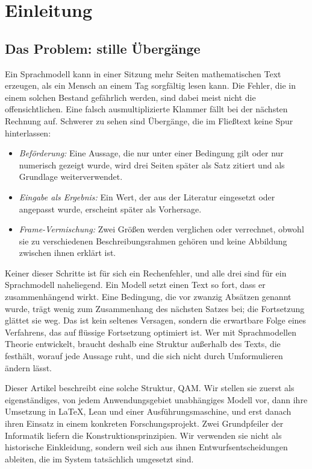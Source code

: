 \section{Einleitung}\label{sec:einleitung}

\subsection{Das Problem: stille Übergänge}

Ein Sprachmodell kann in einer Sitzung mehr Seiten mathematischen Text erzeugen, als ein Mensch an einem Tag sorgfältig lesen
kann. Die Fehler, die in einem solchen Bestand gefährlich werden, sind dabei meist nicht die offensichtlichen. Eine falsch
ausmultiplizierte Klammer fällt bei der nächsten Rechnung auf. Schwerer zu sehen sind Übergänge, die im Fließtext keine Spur
hinterlassen:
\begin{itemize}[nosep]
\item \emph{Beförderung:} Eine Aussage, die nur unter einer Bedingung gilt oder nur numerisch gezeigt wurde, wird drei Seiten
später als Satz zitiert und als Grundlage weiterverwendet.
\item \emph{Eingabe als Ergebnis:} Ein Wert, der aus der Literatur eingesetzt oder angepasst wurde, erscheint später als
Vorhersage.
\item \emph{Frame-Vermischung:} Zwei Größen werden verglichen oder verrechnet, obwohl sie zu verschiedenen Beschreibungsrahmen
gehören und keine Abbildung zwischen ihnen erklärt ist.
\end{itemize}
Keiner dieser Schritte ist für sich ein Rechenfehler, und alle drei sind für ein Sprachmodell naheliegend. Ein Modell setzt
einen Text so fort, dass er zusammenhängend wirkt. Eine Bedingung, die vor zwanzig Absätzen genannt wurde, trägt wenig zum
Zusammenhang des nächsten Satzes bei; die Fortsetzung glättet sie weg. Das ist kein seltenes Versagen, sondern die erwartbare
Folge eines Verfahrens, das auf flüssige Fortsetzung optimiert ist. Wer mit Sprachmodellen Theorie entwickelt, braucht deshalb
eine Struktur außerhalb des Texts, die festhält, worauf jede Aussage ruht, und die sich nicht durch Umformulieren ändern lässt.

Dieser Artikel beschreibt eine solche Struktur, QAM. Wir stellen sie zuerst als eigenständiges, von jedem Anwendungsgebiet
unabhängiges Modell vor, dann ihre Umsetzung in \LaTeX, Lean und einer Ausführungsmaschine, und erst danach ihren Einsatz in einem
konkreten Forschungsprojekt. Zwei Grundpfeiler der Informatik liefern die Konstruktionsprinzipien. Wir verwenden sie nicht als
historische Einkleidung, sondern weil sich aus ihnen Entwurfsentscheidungen ableiten, die im System tatsächlich umgesetzt sind.


